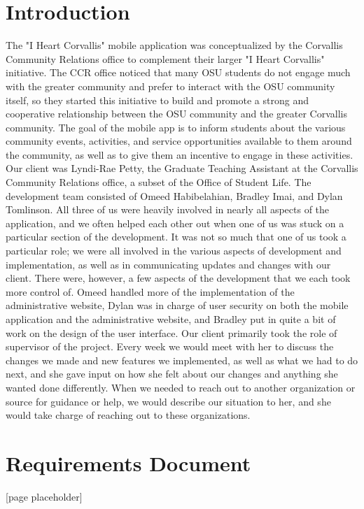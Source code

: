 \documentclass[onecolumn, draftclsnofoot,10pt, compsoc]{IEEEtran}
\begin{document}
\section{Introduction}
  The "I Heart Corvallis" mobile application was conceptualized by the Corvallis Community Relations office to complement their larger "I Heart Corvallis" initiative. The CCR office noticed that many OSU students do not engage much with the greater community and prefer to interact with the OSU community itself, so they started this initiative to build and promote a strong and cooperative relationship between the OSU community and the greater Corvallis community. The goal of the mobile app is to inform students about the various community events, activities, and service opportunities available to them around the community, as well as to give them an incentive to engage in these activities.
  Our client was Lyndi-Rae Petty, the Graduate Teaching Assistant at the Corvallis Community Relations office, a subset of the Office of Student Life. The development team consisted of Omeed Habibelahian, Bradley Imai, and Dylan Tomlinson. All three of us were heavily involved in nearly all aspects of the application, and we often helped each other out when one of us was stuck on a particular section of the development. It was not so much that one of us took a particular role; we were all involved in the various aspects of development and implementation, as well as in communicating updates and changes with our client. There were, however, a few aspects of the development that we each took more control of. Omeed handled more of the implementation of the administrative website, Dylan was in charge of user security on both the mobile application and the administrative website, and Bradley put in quite a bit of work on the design of the user interface.
  Our client primarily took the role of supervisor of the project. Every week we would meet with her to discuss the changes we made and new features we implemented, as well as what we had to do next, and she gave input on how she felt about our changes and anything she wanted done differently. When we needed to reach out to another organization or source for guidance or help, we would describe our situation to her, and she would take charge of reaching out to these organizations.
  \newpage

\section{Requirements Document}
  [page placeholder]\newpage
\end{document}
